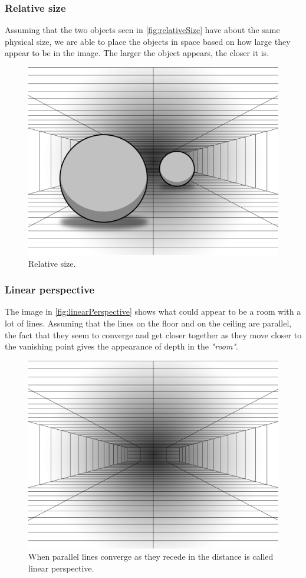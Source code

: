 \subsubsection{Relative size}
Assuming that the two objects seen in \autoref{fig:relativeSize} have about the same physical size, we are able to place the objects in space based on how large they appear to be in the image. The larger the object appears, the closer it is\citep[p.~200]{sensationPerception}.
\begin{figure}[H]
	\centering
	\includegraphics[width=0.8\linewidth]{figure/Analysis/relativeSize.png}
	\caption{Relative size.}
	\label{fig:relativeSize}
\end{figure}

\subsubsection{Linear perspective}
The image in \autoref{fig:linearPerspective} shows what could appear to be a room with a lot of lines. Assuming that the lines on the floor and on the ceiling are parallel, the fact that they seem to converge and get closer together as they move closer to the vanishing point gives the appearance of depth in the \textit{"room"}\citep[p.~201]{sensationPerception}.
\begin{figure}[H]
	\centering
	\includegraphics[width=0.8\linewidth]{figure/Analysis/linearPerspective.png}
	\caption{When parallel lines converge as they recede in the distance is called linear perspective.}
	\label{fig:linearPerspective}
\end{figure}


